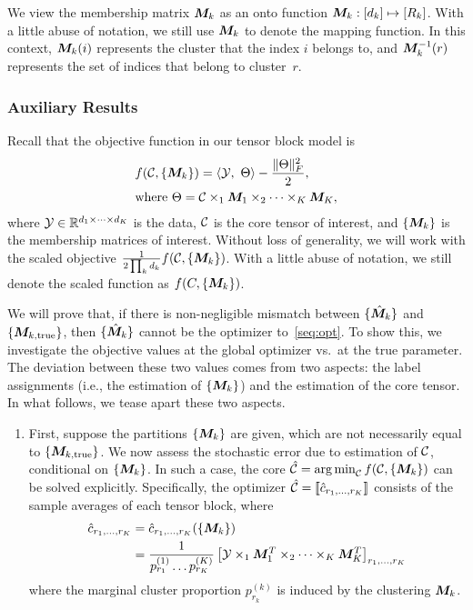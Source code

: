 \documentclass{article}
\begin{document}
\begin{appendices}
We view the membership matrix $\bm M_k$ as an onto function $\bm M_k: [d_k] \mapsto [R_k]$. With a little abuse of notation, we still use $\bm M_k$ to denote the mapping function. In this context, $\bm M_k(i)$ represents the cluster that the index $i$ belongs to, and $\bm M_k^{-1}(r)$ represents the set of indices that belong to cluster~$r$.

\subsubsection{Auxiliary Results}

Recall that the objective function in our tensor block model is 
\begin{align}\label{seq:opt}
&f(\mathcal{C}, \{ \bm M_k\})=\langle \mathcal{Y},\ \Theta\rangle -\frac{\lVert\Theta\rVert_F^2}{2},\\
&\text{where } \Theta=\mathcal{C}\times_1\bm M_1\times_2\cdots\times_K \bm M_K,
\end{align}
where $\mathcal{Y}\in\mathbb{R}^{d_1\times \cdots \times d_K}$ is the data, $\mathcal{C}$ is the core tensor of interest, and $\{\bm M_k\}$ is the membership matrices of interest. Without loss of generality, we will work with the scaled objective ${1\over 2\prod_k d_k}f(\mathcal{C}, \{\bm M_k\})$. With a little abuse of notation, we still denote the scaled function as $f(C,\{\bm M_k\})$.

We will prove that, if there is non-negligible mismatch between $\{\hat {\bm M}_k\}$ and $\{\bm M_{k,\text{true}}\}$, then $\{\hat {\bm M}_k\}$ cannot be the optimizer to~\eqref{seq:opt}. To show this, we investigate the objective values at the global optimizer vs.\ at the true parameter. The deviation between these two values comes from two aspects: the label assignments (i.e., the estimation of $\{\bm M_k\}$) and the estimation of the core tensor. In what follows, we tease apart these two aspects.
 
 \begin{enumerate}
\item First, suppose the partitions $\{\bm M_k\}$ are given, which are not necessarily equal to $\{\bm M_{k,\text{true}}\}$. We now assess the stochastic error due to estimation of $\mathcal{C}$, conditional on $\{\bm M_k\}$. In such a case, the core $\hat {\mathcal{C}} = \operatorname*{arg\,min}_{\mathcal{C}} f(\mathcal{C},\{\bm M_k\})$ can be solved explicitly. Specifically, the optimizer $\hat {\mathcal{C}}=\llbracket \hat c_{r_1,\ldots,r_K} \rrbracket$ consists of the sample averages of each tensor block, where
\begin{align}\label{eq:core}
\displaystyle \hat c_{r_1,\ldots,r_K}&=\hat c_{r_1,\ldots,r_K}(\{\bm M_k\})\\
&= \frac{1}{p_{r_1}^{(1)}\ldots p_{r_K}^{(K)}}\left[\mathcal{Y}\times_1\bm M^T_1\times_2\cdots\times_K \bm M^T_K\right]_{r_1,\ldots,r_K}
\end{align}
where the marginal cluster proportion $p^{(k)}_{r_k}$ is induced by the clustering $\bm M_k$. 


\end{enumerate}
\end{appendices}
\end{document}
